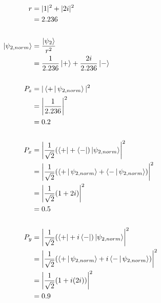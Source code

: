 \documentclass[12pt]{article}
\begin{document}
    \begin{align*}
        r &= |1|^2 + |2i|^2 \\
            &= 2.236 \\
        \\ 
        \Ket{\psi_{2,norm}} &= \frac{\Ket{\psi_2}}{r^2} \\
                             &= \frac{1}{2.236}\Ket{+} + \frac{2i}{2.236}\Ket{-} \\
        \\
        P_z &= |\Braket{+|\psi_{2,norm}}|^2 \\
            &= \left|\frac{1}{2.236}\right|^2 \\
            &= 0.2 \\
        \\
        P_x &= \left|\frac{1}{\sqrt{2}}
            (\Bra{+} + \Bra{-})\Ket{\psi_{2,norm}}\right|^2 \\
            &= \left|\frac{1}{\sqrt{2}}
            (\Braket{+|\psi_{2,norm}} + \Braket{-|\psi_{2,norm}})\right|^2 \\
            &= \left|\frac{1}{\sqrt{2}} (1 + 2i)\right|^2 \\
            &= 0.5 \\
        \\
        P_y &= \left|\frac{1}{\sqrt{2}}
            (\Bra{+} + i\Bra{-})\Ket{\psi_{2,norm}}\right|^2 \\
            &= \left|\frac{1}{\sqrt{2}}
            (\Braket{+|\psi_{2,norm}} + i\Braket{-|\psi_{2,norm}})\right|^2 \\
            &= \left|\frac{1}{\sqrt{2}} (1 + i(2i))\right|^2 \\
            &= 0.9
    \end{align*}


    
    
\end{document}
